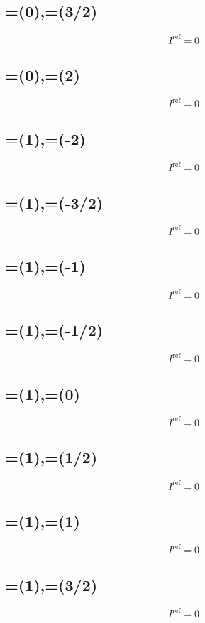 \documentclass[11pt,a4paper]{article}
\newcommand{\Iref}{I^{\mathrm{ref}}}
\begin{document}
\subsection{=(0),\;=(3/2)}
\[ \Iref = 0 \]

\subsection{=(0),\;=(2)}
\[ \Iref = 0 \]

\subsection{=(1),\;=(-2)}
\[ \Iref = 0 \]

\subsection{=(1),\;=(-3/2)}
\[ \Iref = 0 \]

\subsection{=(1),\;=(-1)}
\[ \Iref = 0 \]

\subsection{=(1),\;=(-1/2)}
\[ \Iref = 0 \]

\subsection{=(1),\;=(0)}
\[ \Iref = 0 \]

\subsection{=(1),\;=(1/2)}
\[ \Iref = 0 \]

\subsection{=(1),\;=(1)}
\[ \Iref = 0 \]

\subsection{=(1),\;=(3/2)}
\[ \Iref = 0 \]
\end{document}

